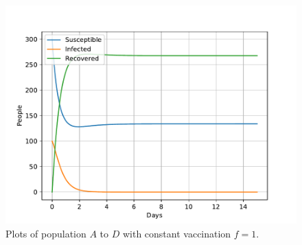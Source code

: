 \documentclass[a4paper]{article}
\begin{document}
\begin{figure}[!htb]
	\includegraphics[scale=0.56]{../plots/opp_e_D0.pdf}
	\caption{Plots of population $A$ to $D$ with constant vaccination $f=1$.}
	\label{opp_e0}
\end{figure}
\end{document}
